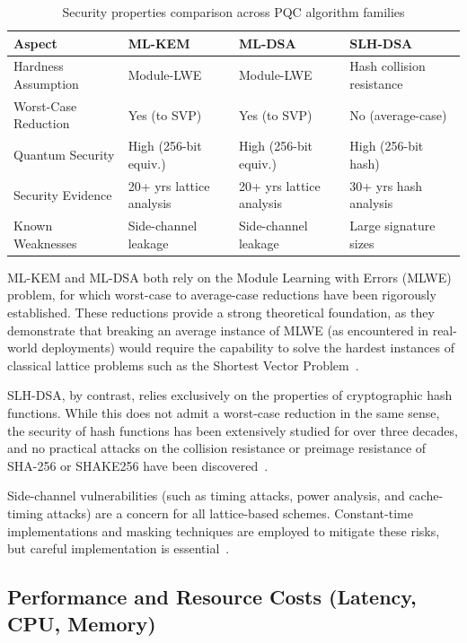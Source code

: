 \documentclass[12pt,a4paper]{article}
\begin{document}
\begin{table}[htbp]
\centering
\caption{Security properties comparison across PQC algorithm families}
\label{tab:security-comparison}
\begin{tabular}{llll}
\toprule
\textbf{Aspect} & \textbf{ML-KEM} & \textbf{ML-DSA} & \textbf{SLH-DSA} \\
\midrule
Hardness Assumption & Module-LWE & Module-LWE & Hash collision resistance \\
Worst-Case Reduction & Yes (to SVP) & Yes (to SVP) & No (average-case) \\
Quantum Security & High (256-bit equiv.) & High (256-bit equiv.) & High (256-bit hash) \\
Security Evidence & 20+ yrs lattice analysis & 20+ yrs lattice analysis & 30+ yrs hash analysis \\
Known Weaknesses & Side-channel leakage & Side-channel leakage & Large signature sizes \\
\bottomrule
\end{tabular}
\end{table}

ML-KEM and ML-DSA both rely on the Module Learning with Errors (MLWE) problem, for which worst-case to average-case reductions have been rigorously established. These reductions provide a strong theoretical foundation, as they demonstrate that breaking an average instance of MLWE (as encountered in real-world deployments) would require the capability to solve the hardest instances of classical lattice problems such as the Shortest Vector Problem~\cite{nist-fips-203-2024,nist-fips-204-2024}.

SLH-DSA, by contrast, relies exclusively on the properties of cryptographic hash functions. While this does not admit a worst-case reduction in the same sense, the security of hash functions has been extensively studied for over three decades, and no practical attacks on the collision resistance or preimage resistance of SHA-256 or SHAKE256 have been discovered~\cite{nist-fips-205-2024}.

Side-channel vulnerabilities (such as timing attacks, power analysis, and cache-timing attacks) are a concern for all lattice-based schemes. Constant-time implementations and masking techniques are employed to mitigate these risks, but careful implementation is essential~\cite{nist-fips-203-2024,nist-fips-204-2024}.

\subsection{Performance and Resource Costs (Latency, CPU, Memory)}
\end{document}

